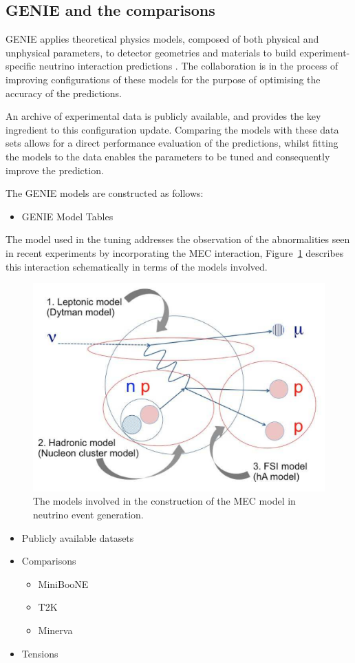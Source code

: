 
\subsection{GENIE and the comparisons}
GENIE applies theoretical physics models, composed of both physical and unphysical parameters, to detector geometries and materials to build experiment-specific neutrino interaction predictions \cite{genie}. The collaboration is in the process of improving configurations of these models for the purpose of optimising the accuracy of the predictions.

    An archive of experimental data is publicly available, and provides the key ingredient to this configuration update. Comparing the models with these data sets allows for a direct performance evaluation of the predictions, whilst fitting the models to the data enables the parameters to be tuned and consequently improve the prediction.

The GENIE models are constructed as follows:

\begin{itemize}
    \item GENIE Model Tables
\end{itemize}

The model used in the tuning addresses the observation of the abnormalities seen in recent experiments by incorporating the MEC interaction, Figure~\ref{fig:MECSchem} \cite{MEC} describes this interaction schematically in terms of the models involved. 

\begin{figure}[h!]
    \centering
    \includegraphics[width=.6\textwidth]{images/mec_model_genie.png}
    \caption{The models involved in the construction of the MEC model in neutrino event generation.}
    \label{fig:MECSchem}
\end{figure}


\begin{itemize}
    \item Publicly available datasets
    \item Comparisons
    \begin{itemize}
        \item MiniBooNE
        \item T2K
        \item Minerva
    \end{itemize}
    \item Tensions
\end{itemize}

